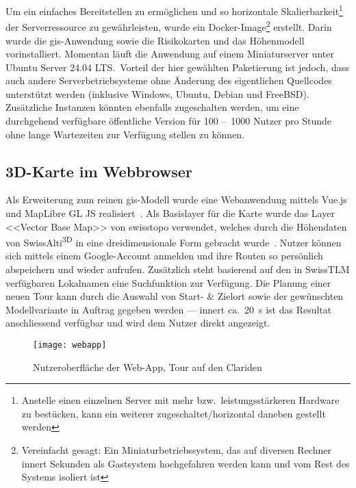 Um ein einfaches Bereitstellen zu ermöglichen und so horizontale Skalierbarkeit\footnote{Anstelle einen einzelnen Server mit mehr bzw.\ leistungsstärkeren Hardware zu bestücken, kann ein weiterer zugeschaltet/horizontal daneben gestellt werden} der Serverressource zu gewährleisten, wurde ein Docker-Image\footnote{Vereinfacht gesagt: Ein Miniaturbetriebssystem, das auf diversen Rechner innert Sekunden als Gastsystem hochgefahren werden kann und vom Rest des Systems isoliert ist} erstellt. Darin wurde die \gls{gis}-Anwendung sowie die Risikokarten und das Höhenmodell vorinstalliert. Momentan läuft die Anwendung auf einem Miniaturserver unter Ubuntu Server 24.04 LTS.\ Vorteil der hier gewählten Paketierung ist jedoch, dass auch andere Serverbetriebsysteme ohne Änderung des eigentlichen Quellcodes unterstützt werden (inklusive Windows, Ubuntu, Debian und FreeBSD). Zusätzliche Instanzen könnten ebenfalls zugeschalten werden, um eine durchgehend verfügbare öffentliche Version für 100 --~1000 Nutzer pro Stunde ohne lange Wartezeiten zur Verfügung stellen zu können.

\clearpage
\subsection{3D-Karte im Webbrowser}

Als Erweiterung zum reinen \gls{gis}-Modell wurde eine Webanwendung mittels Vue.js und MapLibre GL JS realisiert~\cite{vuedevman}\cite{maplibregljs}. Als Basislayer für die Karte wurde das Layer <<Vector Base Map>> von swisstopo verwendet, welches durch die Höhendaten von SwissAlti\textsuperscript{3D} in eine dreidimensionale Form gebracht wurde~\cite{basevtprod}\cite{alti3dprod}. Nutzer können sich mittels einem Google-Account anmelden und ihre Routen so persönlich abspeichern und wieder aufrufen. Zusätzlich steht basierend auf den in SwissTLM verfügbaren Lokalnamen eine Suchfunktion zur Verfügung.
Die Planung einer neuen Tour kann durch die Auswahl von Start- \& Zielort sowie der gewünschten Modellvariante in Auftrag gegeben werden --- innert ca.\ \qty{20}{s} ist das Resultat anschliessend verfügbar und wird dem Nutzer direkt angezeigt.


  \begin{figure}[H]
    \centering
    \texttt{[image: webapp]}
    \caption{Nutzeroberfläche der Web-App, Tour auf den Clariden}\label{fig:mainui}
  \end{figure}



